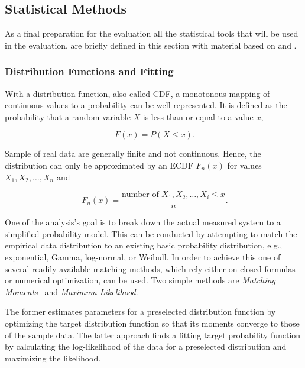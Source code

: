 \subsection{Statistical Methods}

As a final preparation for the evaluation all the statistical tools that will be used in the evaluation, are briefly defined in this section with material based on \cite{field2012discovering} and \cite{Knuth:1997:ACP:270146}.


\subsubsection{Distribution Functions and Fitting}

With a distribution function, also called \gls{CDF}, a monotonous mapping of continuous values to a probability can be well represented. It is defined as the probability that a random variable $X$ is less than or equal to a value $x$, 

\begin{equation}
	\phantom{.} F(x) = P(X\leq x)\text{.}
\end{equation}

Sample of real data are generally finite and not continuous. Hence, the distribution can only be approximated by an \gls{ECDF} $F_n(x)$ for values $X_1, X_2, \ldots , X_n$ and

\begin{equation}
	\phantom{.}F_n(x) = \frac{\text{number of }X_1, X_2, \ldots , X_i \leq x}{n}\text{.}
\end{equation}

One of the analysis's goal is to break down the actual measured system to a simplified probability model. This can be conducted by attempting to match the empirical data distribution to an existing basic probability distribution, e.g., exponential, Gamma, log-normal, or Weibull. In order to achieve this one of several readily available matching methods, which rely either on closed formulas or numerical optimization, can be used. Two simple methods are \textit{Matching Moments}~\cite[pp.~99-143]{vose2000risk} and \textit{Maximum Likelihood}.

The former estimates parameters for a preselected distribution function by optimizing the target distribution function so that its moments converge to those of the sample data. The latter approach finds a fitting target probability function by calculating the log-likelihood of the data for a preselected distribution and maximizing the likelihood.

